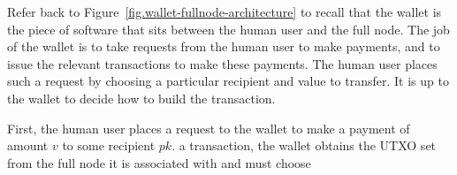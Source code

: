 Refer back to Figure~\ref{fig.wallet-fullnode-architecture} to recall that the wallet
is the piece of software that sits between the human user and the full node. The job of
the wallet is to take requests from the human user to make payments, and to issue the relevant
transactions to make these payments. The human user places such a request by choosing a particular
recipient and value to transfer. It is up to the wallet to decide how to build the transaction.

First, the human user places a request to the wallet to make a payment of amount $v$ to some
recipient $pk$. a transaction, the wallet obtains the UTXO set from the full node it is
associated with and must choose

%
%
%
%

